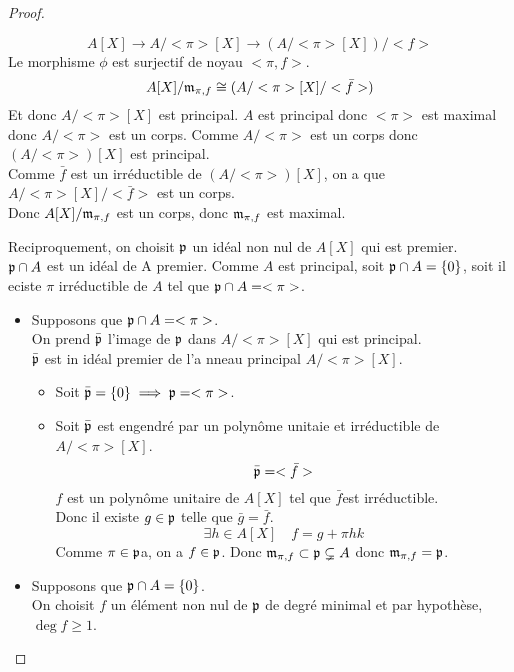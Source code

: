 \begin{proof}
\begin{itemize}
		      $$A[X] \to A/<\pi>[X] \to (A/<\pi>[X])/<f> $$ %
		      Le morphisme $\phi$ est surjectif de noyau $<\pi,f>$.
		      $$ A[X]/\mathfrak{m}_{\pi,f} \cong (A/<\pi>[X]/<\bar{f}>)$$
		      Et donc $A/<\pi>[X]$ est principal.
		      $A$ est principal donc $<\pi>$ est maximal donc $A/<\pi>$ est un corps. Comme $A/<\pi>$ est un corps donc $(A/<\pi>)[X]$ est principal.\\
		      Comme $\bar{f}$ est un irréductible de $(A/<\pi>)[X]$, on a que $A/<\pi>[X]/<\bar{f}>$ est un corps.\\
		      Donc $A[X]/\mathfrak{m}_{\pi,f}$ est un corps, donc $\mathfrak{m}_{\pi,f}$ est maximal.
	\end{itemize}
	\vspace{0.25cm}
	\noindent Reciproquement, on choisit $\mathfrak{p}$ un idéal non nul de $A[X]$ qui est premier. \\
	$\mathfrak{p} \cap A$ est un idéal de A premier.
	Comme $A$ est principal, soit $\mathfrak{p} \cap A = \{0\}$, soit il eciste $\pi$ irréductible de $A$ tel que $\mathfrak{p} \cap A = <\pi>$.
	\begin{itemize}
		\item Supposons que $\mathfrak{p} \cap A = <\pi>$.\\
		      On prend $\bar{\mathfrak{p}}$ l'image de $\mathfrak{p}$ dans $A/<\pi>[X]$ qui est principal.\\
		      $\bar{\mathfrak{p}}$ est in idéal premier de l'a nneau principal $A/<\pi>[X]$.\\
		      \begin{itemize}
			      \item Soit $\bar{\mathfrak{p}} = \{0\} \implies \mathfrak{p} = <\pi>$.
			      \item Soit $\bar{\mathfrak{p}}$ est engendré par un polynôme unitaie et irréductible de $A/<\pi>[X]$.
			            $$ \bar{\mathfrak{p}} = <\bar{f}> $$
			            $f$ est un polynôme unitaire de $A[X]$ tel que $\bar{f}$est irréductible. \\
			            Donc il existe $g \in \mathfrak{p}$ telle que $\bar{g} = \bar{f}$.
			            $$ \exists h \in A[X] \quad f = g + \pi h k$$
			            Comme $\pi \in \mathfrak{p}$a, on a $f \in \mathfrak{p}$.
			            Donc $\mathfrak{m}_{\pi,f} \subset \mathfrak{p} \subsetneq A$
			            donc $\mathfrak{m}_{\pi,f} = \mathfrak{p}$.
		      \end{itemize}
		\item Supposons que $\mathfrak{p} \cap A = \{0\}$.\\
		      On choisit $f$ un élément non nul de $\mathfrak{p}$ de degré minimal et par hypothèse, $\deg f \geq 1$.\\

\end{itemize}
\end{proof}
